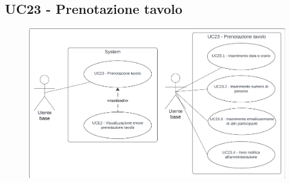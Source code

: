 \subsection{UC23 - Prenotazione tavolo}\label{usecase:23}

\begin{figure}[H]
  \centering
  \includegraphics[width=0.9\linewidth]{ucd/UCD23.png}
\end{figure}

